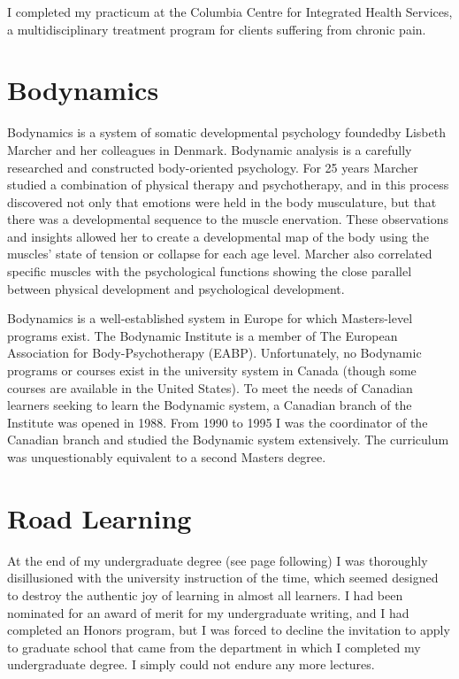 \documentclass[10pt,DIV09,letterpaper,oneside,headsepline]{scrreprt}
\begin{document}
I completed my practicum at the Columbia Centre for Integrated Health Services, a multidisciplinary treatment program for clients suffering from chronic pain.

\section{Bodynamics}

Bodynamics is a system of somatic developmental psychology foundedby Lisbeth Marcher and her colleagues in Denmark. Bodynamic analysis is a carefully researched and constructed body-oriented psychology. For 25 years Marcher studied a combination of physical therapy and psychotherapy, and in this process discovered not only that emotions were held in the body musculature, but that there was a developmental sequence to the muscle enervation. These observations and insights allowed her to create a developmental map of the body using the muscles' state of tension or collapse for each age level. Marcher also correlated specific muscles with the psychological functions showing the close parallel between physical development and psychological development.

Bodynamics is a well-established system in Europe for which Masters-level programs exist. The Bodynamic Institute is a member of The European Association for Body-Psychotherapy (EABP). Unfortunately, no Bodynamic programs or courses exist in the university system in Canada (though some courses are available in the United States). To meet the needs of Canadian learners seeking to learn the Bodynamic system, a Canadian branch of the Institute was opened in 1988. From 1990 to 1995 I was the coordinator of the Canadian branch and studied the Bodynamic system extensively. The curriculum was unquestionably equivalent to a second Masters degree.

\section{Road Learning}

At the end of my undergraduate degree (see page following) I was thoroughly disillusioned with the university instruction of the time, which seemed designed to destroy the authentic joy of learning in almost all learners. I had been nominated for an award of merit for my undergraduate writing, and I had completed an Honors program, but I was forced to decline the invitation to apply to graduate school that came from the department in which I completed my undergraduate degree. I simply could not endure any more lectures.
\end{document}
